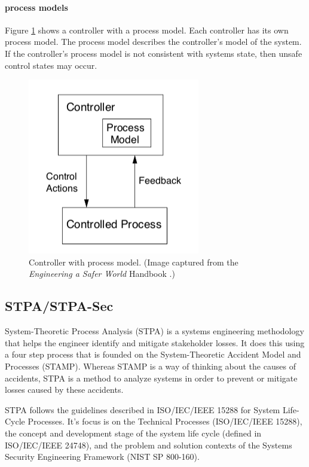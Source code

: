 \documentclass[../../main/main.tex]{subfiles}
\begin{document}
\paragraph*{process models}
Figure \ref{processmodel} shows a controller with a process model.  Each controller has its own process model.  The process model describes the controller's model of the system.  If the controller's process model is not consistent with systems state, then unsafe control states may occur.

\begin{figure}[h!]
\centering
\includegraphics[width=0.5\linewidth]{../figures/processmodel}
\caption{\label{processmodel} Controller with process model. (Image captured from the \textit{Engineering a Safer World} Handbook \cite{safe}.)}
\end{figure}
\subsection{STPA/STPA-Sec}\label{ssec:stpa}
System-Theoretic Process Analysis (STPA) is a systems engineering methodology that helps the engineer identify and mitigate stakeholder losses. It does this using a four step process that is founded on the System-Theoretic Accident Model and Processes (STAMP).  Whereas STAMP is a way of thinking about the causes of accidents, STPA is a method to analyze systems in order to prevent or mitigate losses caused by these accidents.  

STPA follows the guidelines described in ISO/IEC/IEEE 15288 for System Life-Cycle Processes.  It's focus is on the Technical Processes (ISO/IEC/IEEE 15288), the concept and development stage of the system life cycle (defined in ISO/IEC/IEEE 24748), and the problem and solution contexts of the Systems Security Engineering Framework (NIST SP 800-160).
\end{document}

